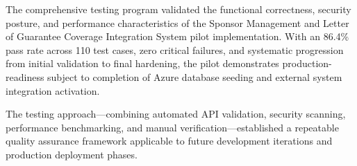 The comprehensive testing program validated the functional correctness, security posture, and performance characteristics of the Sponsor Management and Letter of Guarantee Coverage Integration System pilot implementation. With an 86.4\% pass rate across 110 test cases, zero critical failures, and systematic progression from initial validation to final hardening, the pilot demonstrates production-readiness subject to completion of Azure database seeding and external system integration activation.

The testing approach—combining automated API validation, security scanning, performance benchmarking, and manual verification—established a repeatable quality assurance framework applicable to future development iterations and production deployment phases.
